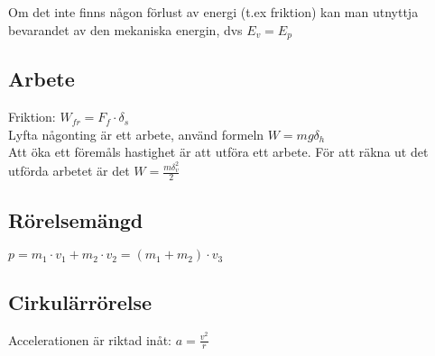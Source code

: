 Om det inte finns någon förlust av energi (t.ex friktion) kan man utnyttja bevarandet av den mekaniska energin, dvs
\begin{math}
    E_v = E_p
\end{math} \\[2pt]

\subsection{Arbete}
Friktion: 
\begin{math}
    W_{fr} = F_f \cdot \delta_s
\end{math} \\[2pt]

Lyfta någonting är ett arbete, använd formeln 
\begin{math}
    W = mg\delta_h
\end{math} \\[2pt]
Att öka ett föremåls hastighet är att utföra ett arbete. För att räkna ut det utförda arbetet är det
\begin{math}
    W = \frac{m\delta_v^2}{2}
\end{math} \\[2pt]

\subsection{Rörelsemängd}
\begin{math}
    p = m_1 \cdot v_1 + m_2 \cdot v_2 = (m_1 + m_2) \cdot v_3
\end{math} \\[2pt]

\subsection{Cirkulärrörelse}
Accelerationen är riktad inåt:
\begin{math}
    a = \frac{v^2}{r}
\end{math} \\[2pt]
